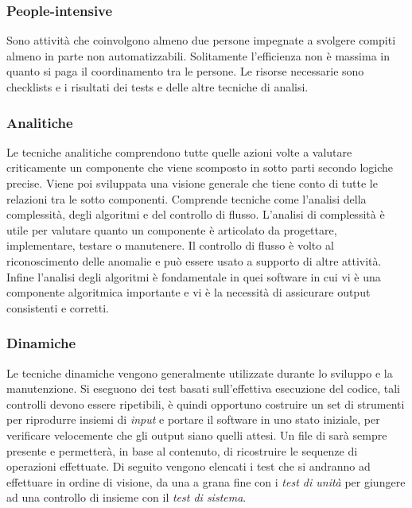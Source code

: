 		\subsubsection{People-intensive}	
	Sono attività che coinvolgono almeno due persone impegnate a svolgere compiti almeno in parte non automatizzabili. Solitamente l'efficienza non è massima in quanto si paga il coordinamento tra le persone. Le risorse necessarie sono checklists e i risultati dei tests e delle altre tecniche di analisi.	
	
		\subsubsection{Analitiche}		
		Le tecniche analitiche comprendono tutte quelle azioni volte a valutare criticamente un 	componente che viene scomposto in sotto parti secondo logiche precise. Viene poi sviluppata una visione generale che tiene conto di tutte le relazioni tra le sotto componenti. Comprende tecniche come l'analisi della complessità, degli algoritmi e del controllo di flusso. L'analisi di complessità è utile per valutare quanto un componente è articolato da progettare, implementare, testare o manutenere. Il controllo di flusso è volto al riconoscimento delle anomalie e può essere usato a supporto di altre attività. Infine l'analisi degli algoritmi è fondamentale in quei software in cui vi è una componente algoritmica importante e vi è la necessità di assicurare output consistenti e corretti. 
				
		\subsubsection{Dinamiche}
		Le tecniche dinamiche vengono generalmente utilizzate durante lo sviluppo e la manutenzione. Si eseguono dei test basati sull'effettiva esecuzione del codice, tali controlli devono essere ripetibili, è quindi opportuno costruire un set di strumenti per riprodurre insiemi di \emph{input} e portare il software in uno stato iniziale, per verificare velocemente che gli output siano quelli attesi. Un file di  sarà sempre presente e permetterà, in base al contenuto, di ricostruire le sequenze di operazioni effettuate. Di seguito vengono elencati i test che si andranno ad effettuare in ordine di visione, da una a grana fine con i \emph{test di unità} per giungere ad una controllo di insieme con il \emph{test di sistema}.
		
